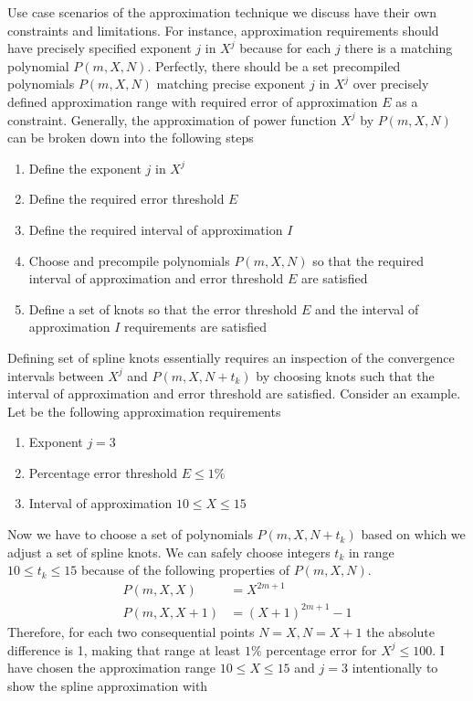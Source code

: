 ﻿Use case scenarios of the approximation technique we discuss have their own constraints and limitations.
For instance, approximation requirements should have precisely specified exponent $j$ in $X^j$ because
for each $j$ there is a matching polynomial $P(m,X,N)$.
Perfectly, there should be a set precompiled polynomials $P(m,X,N)$ matching precise exponent $j$ in $X^j$ over
precisely defined approximation range with required error of approximation $E$ as a constraint.
Generally, the approximation of power function $X^j$ by $P(m,X,N)$ can be broken down into the following steps
\begin{enumerate}
    \item Define the exponent $j$ in $X^j$
    \item Define the required error threshold $E$
    \item Define the required interval of approximation $I$
    \item Choose and precompile polynomials $P(m,X,N)$
    so that the required interval of approximation and error threshold $E$ are satisfied
    \item Define a set of knots so that the error threshold $E$ and the interval of approximation $I$ requirements are satisfied
\end{enumerate}
Defining set of spline knots essentially requires an inspection of the
convergence intervals between $X^j$ and $P(m,X,N+t_k)$
by choosing knots such that the interval of approximation and error threshold are satisfied.
Consider an example.
Let be the following approximation requirements
\begin{enumerate}
    \item Exponent $j=3$
    \item Percentage error threshold $E\leq 1\%$
    \item Interval of approximation $10 \leq X \leq 15$
\end{enumerate}
Now we have to choose a set of polynomials $P(m, X, N+t_k)$ based on which we adjust a set of spline knots.
We can safely choose integers $t_k$ in range $10 \leq t_k \leq 15$ because
of the following properties of $P(m,X, N)$.
\begin{align*}
    P(m,X, X) &= X^{2m+1} \\
    P(m,X, X+1) &= (X+1)^{2m+1} - 1
\end{align*}
Therefore, for each two consequential points $N=X, N=X+1$ the absolute difference is 1, making that range
at least $1\%$ percentage error for $X^j \leq 100$.
I have chosen the approximation range $10 \leq X \leq 15$ and $j=3$ intentionally to show the spline approximation with
